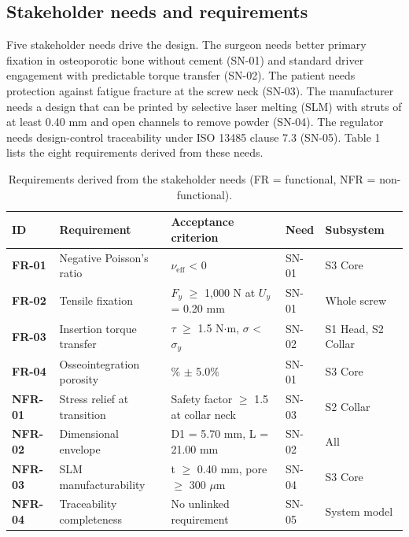 \documentclass[10pt,twocolumn,letterpaper]{article}
\begin{document}
\subsection{Stakeholder needs and requirements}
Five stakeholder needs drive the design. The surgeon needs better primary fixation in osteoporotic bone without cement (SN-01) and standard driver engagement with predictable torque transfer (SN-02). The patient needs protection against fatigue fracture at the screw neck (SN-03). The manufacturer needs a design that can be printed by selective laser melting (SLM) with struts of at least 0.40 mm and open channels to remove powder (SN-04). The regulator needs design-control traceability under ISO 13485 clause 7.3 (SN-05). Table 1 lists the eight requirements derived from these needs.

\begin{table}[!t]
\caption{Requirements derived from the stakeholder needs (FR = functional, NFR = non-functional).}
\centering\fontsize{8}{9.6}\selectfont
\begin{tabular}{>{\raggedright\arraybackslash}p{}>{\raggedright\arraybackslash}p{}>{\raggedright\arraybackslash}p{}>{\centering\arraybackslash}p{}>{\centering\arraybackslash}p{}}
\toprule
\textbf{ID} & \textbf{Requirement} & \textbf{Acceptance criterion} & \textbf{Need} & \textbf{Subsystem} \\
\midrule
\textbf{FR-01} & Negative Poisson's ratio & $\nu_{\mathrm{eff}}$ < 0 & SN-01 & S3 Core \\
\textbf{FR-02} & Tensile fixation & $F_{y}$ $\geq$ 1,000 N at $U_{y}$ = 0.20 mm & SN-01 & Whole screw \\
\textbf{FR-03} & Insertion torque transfer & $\tau$ $\geq$ 1.5 N$\cdot$m, $\sigma$ < $\sigma_{y}$ & SN-02 & S1 Head, S2 Collar \\
\textbf{FR-04} & Osseointegration porosity & 53.0\% $\pm$ 5.0\% & SN-01 & S3 Core \\
\textbf{NFR-01} & Stress relief at transition & Safety factor $\geq$ 1.5 at collar neck & SN-03 & S2 Collar \\
\textbf{NFR-02} & Dimensional envelope & D1 = 5.70 mm, L = 21.00 mm & SN-02 & All \\
\textbf{NFR-03} & SLM manufacturability & t $\geq$ 0.40 mm, pore $\geq$ 300 $\mu$m & SN-04 & S3 Core \\
\textbf{NFR-04} & Traceability completeness & No unlinked requirement & SN-05 & System model \\
\bottomrule
\end{tabular}
\par{}
\end{table}
\end{document}
